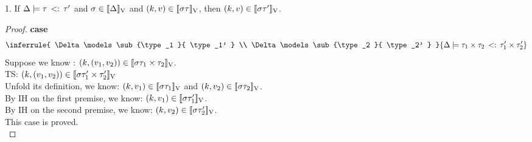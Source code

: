 \clearpage
\begin{lem}\label{lem:sub_sound}
1. If $ \Delta \models  \tau  \, <: \,  \tau'  $ and $ \sigma \in [\![ \Delta ]\!]_{\text{V}}$ and  $(k, v) \in [\![ \sigma \tau ]\!]_{\text{V}}$,  then  $(k, v) \in [\![ \sigma \tau' ]\!]_{\text{V}}$.
  \\
\end{lem}
%
\begin{proof}
\textbf{case}
\[ 
 \inferrule{
     \Delta \models \sub{\type_1 }{ \type_1'  } \\
         \Delta \models \sub{\type_2 }{ \type_2'  }
    }{
       \Delta \models \sub{\type_1 \times \type_2 }{ \type_1' \times \type_2'  }
    }
\]
Suppose we know : $ (k, (v_1, v_2)) \in [\![ \sigma \tau_1 \times \tau_2 ]\!]_{\text{V}} $.\\
TS:  $ (k, (v_1, v_2)) \in [\![ \sigma \tau_1' \times \tau_2' ]\!]_{\text{V}} $ \\
Unfold its definition, we know: $  (k, v_1 ) \in [\![ \sigma \tau_1 ]\!]_{\text{V}} $ and $  (k, v_2 ) \in [\![ \sigma \tau_2 ]\!]_{\text{V}} $.\\
By IH on the first premise, we know: $  (k, v_1 ) \in [\![ \sigma \tau_1' ]\!]_{\text{V}} $.\\
By IH on the second premise, we know: $  (k, v_2 ) \in [\![ \sigma \tau_2' ]\!]_{\text{V}} $.\\
This case is proved.\\


\end{proof}
